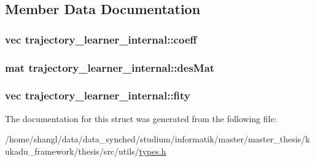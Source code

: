 \subsection{\-Member \-Data \-Documentation}
\hypertarget{structtrajectory__learner__internal_a63ab582b55bfcba62b344cd9c77893a5}{
\subsubsection[{coeff}]{\setlength{\rightskip}{0pt plus 5cm}vec {\bf trajectory\-\_\-learner\-\_\-internal\-::coeff}}}\label{structtrajectory__learner__internal_a63ab582b55bfcba62b344cd9c77893a5}
\hypertarget{structtrajectory__learner__internal_a992d61017fe91308b53624c9ed5a2478}{
\subsubsection[{des\-Mat}]{\setlength{\rightskip}{0pt plus 5cm}mat {\bf trajectory\-\_\-learner\-\_\-internal\-::des\-Mat}}}\label{structtrajectory__learner__internal_a992d61017fe91308b53624c9ed5a2478}
\hypertarget{structtrajectory__learner__internal_ac2aa3acad16fdf01628a14fae49a69ab}{
\subsubsection[{fity}]{\setlength{\rightskip}{0pt plus 5cm}vec {\bf trajectory\-\_\-learner\-\_\-internal\-::fity}}}\label{structtrajectory__learner__internal_ac2aa3acad16fdf01628a14fae49a69ab}


\-The documentation for this struct was generated from the following file\-:\begin{DoxyCompactItemize}
\item 
/home/shangl/data/data\-\_\-synched/studium/informatik/master/master\-\_\-thesis/kukadu\-\_\-framework/thesis/src/utils/\hyperlink{types_8h}{types.\-h}\end{DoxyCompactItemize}

